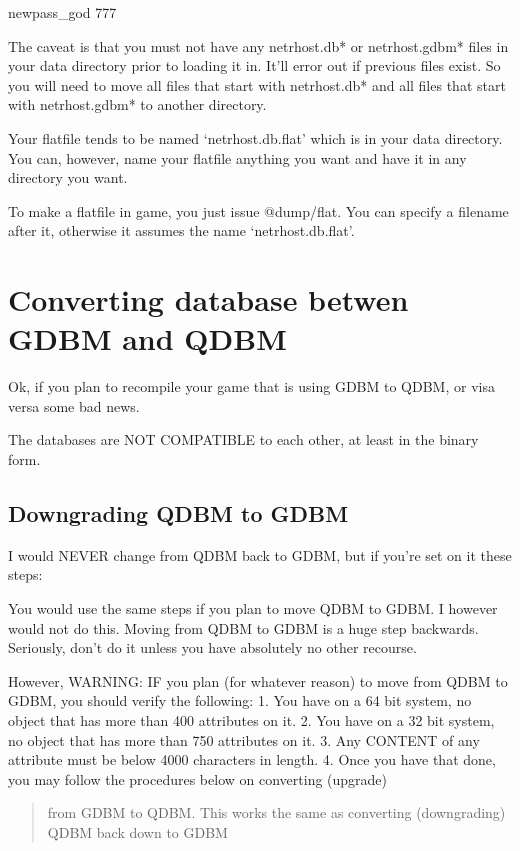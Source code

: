 \documentclass[letterpaper,10pt,english]{sphinxmanual}
\begin{document}
\sphinxAtStartPar
newpass\_god 777

\sphinxAtStartPar
The caveat is that you must not have any netrhost.db* or netrhost.gdbm* files
in your data directory prior to loading it in.  It’ll error out if previous
files exist.  So you will need to move all files that start with netrhost.db*
and all files that start with netrhost.gdbm* to another directory.

\sphinxAtStartPar
Your flatfile tends to be named ‘netrhost.db.flat’ which is in your data
directory.  You can, however, name your flatfile anything you want and have
it in any directory you want.

\sphinxAtStartPar
To make a flatfile in game, you just issue @dump/flat.  You can specify
a filename after it, otherwise it assumes the name ‘netrhost.db.flat’.


\chapter{Converting database betwen GDBM and QDBM}
\label{\detokenize{33-qdbm:converting-database-betwen-gdbm-and-qdbm}}\label{\detokenize{33-qdbm::doc}}
\sphinxAtStartPar
Ok, if you plan to recompile your game that is using GDBM to QDBM, or visa versa
some bad news.

\sphinxAtStartPar
The databases are NOT COMPATIBLE to each other, at least in the binary form.


\section{Downgrading QDBM to GDBM}
\label{\detokenize{33-qdbm:downgrading-qdbm-to-gdbm}}
\sphinxAtStartPar
I would NEVER change from QDBM back to GDBM, but if you’re set on it these steps:

\sphinxAtStartPar
You would use the same steps if you plan to move QDBM to GDBM.  I however would
not do this.  Moving from QDBM to GDBM is a huge step backwards.  Seriously,
don’t do it unless you have absolutely no other recourse.

\sphinxAtStartPar
However, WARNING:
IF you plan (for whatever reason) to move from QDBM to GDBM, you should verify
the following:
1.  You have on a 64 bit system, no object that has more than 400 attributes on it.
2.  You have on a 32 bit system, no object that has more than 750 attributes on it.
3.  Any CONTENT of any attribute must be below 4000 characters in length.
4.  Once you have that done, you may follow the procedures below on converting (upgrade)
\begin{quote}

\sphinxAtStartPar
from GDBM to QDBM.  This works the same as converting (downgrading)
QDBM back down to GDBM
\end{quote}
\end{document}

